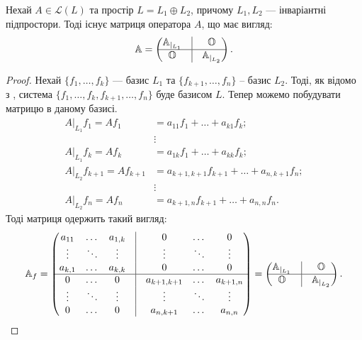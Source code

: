 \documentclass{math_library}
\begin{document}
\fi
\noindent
\begin{proposition}
Нехай $A \in \mathcal{L}(L)$ та простір $L = L_1  \oplus  L_2$, причому $L_1,L_2$ --- інваріантні підпростори. Тоді існує матриця оператора $A$, що має вигляд:
\begin{align*}
\mathbb{A} = \begin{pmatrix}
\mathbb{A}_{|_{L_1}}  & \vline & \mathbb{O} \\
 \hline
 \mathbb{O} & \vline & \mathbb{A}_{|_{L_2}}
\end{pmatrix}.
\end{align*}
\end{proposition}

\begin{proof}
Нехай $\{f_1,\dots,f_k\}$ --- базис $L_1$ та $\{f_{k+1},\dots,f_{n}\}$ -- базис $L_2$. Тоді, як відомо з , система $\{f_1,\dots,f_k,f_{k+1},\dots,f_n\}$ буде базисом $L$. Тепер можемо побудувати матрицю в даному базисі.
\begin{align*}
A|_{L_1}f_1 = Af_1 & = a_{11}f_1 + \dots + a_{k1}f_k; \\
& \vdots \\
A|_{L_1}f_k = Af_k & = a_{1k}f_1 + \dots + a_{kk}f_k; \\
A|_{L_2}f_{k+1} = Af_{k+1} & = a_{k+1,k+1}f_{k+1} + \dots + a_{n,k+1}f_n; \\
& \vdots \\
A|_{L_2}f_n = Af_n & = a_{k+1,n}f_{k+1} + \dots + a_{n,n}f_n.
\end{align*}
Тоді матриця одержить такий вигляд:
\[
\mathbb{A}_f = \begin{pmatrix}
a_{11} & \dots & a_{1,k} & \vline & 0 & \dots & 0 \\
\vdots & \ddots & \vdots & \vline & \vdots & \ddots & \vdots \\
a_{k,1} & \dots & a_{k,k} & \vline & 0 & \dots & 0 \\
\hline
0 & \dots & 0 & \vline & a_{k+1,k+1} & \dots & a_{k+1, n} \\
\vdots & \ddots & \vdots & \vline & \vdots & \ddots & \vdots \\
0 & \dots & 0 & \vline & a_{n,k+1} & \dots & a_{n, n} \\
\end{pmatrix} = \begin{pmatrix}
\mathbb{A}_{|_{L_1}}  & \vline & \mathbb{O} \\
 \hline
 \mathbb{O} & \vline & \mathbb{A}_{|_{L_2}}
\end{pmatrix}. \qedhere
\]
\end{proof}
\end{document}
